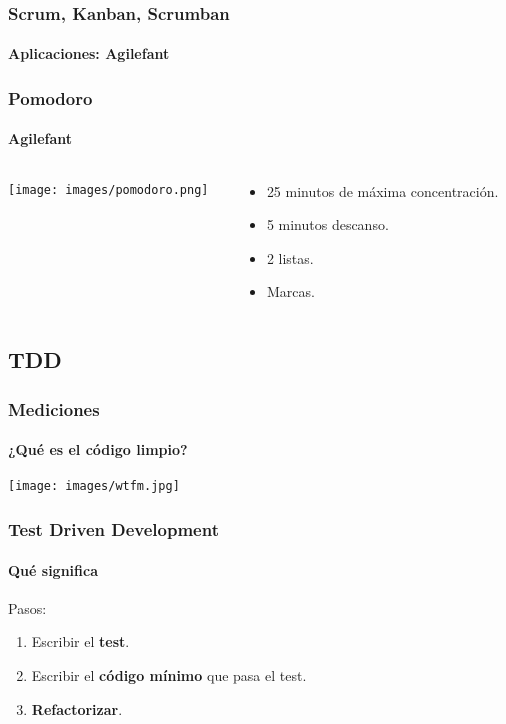   \begin{frame}
   \frametitle{Scrum, Kanban, Scrumban}
   \framesubtitle{Aplicaciones: Agilefant}

   \begin{center}
   \end{center}

  \end{frame}

  \begin{frame}
   \frametitle{Pomodoro}
   \framesubtitle{Agilefant}

   \begin{columns}
    \begin{column}{4cm}
     \texttt{[image: images/pomodoro.png]}
    \end{column}
    \begin{column}{7cm}
     \begin{itemize}
      \item 25 minutos de máxima concentración.
      \item 5 minutos descanso.
      \item 2 listas.
      \item Marcas.
     \end{itemize}
    \end{column}
   \end{columns}
  \end{frame}

  \subsection{TDD}

  \begin{frame}
   \frametitle{Mediciones}
   \framesubtitle{¿Qué es el código limpio?}

   \begin{center}
    \texttt{[image: images/wtfm.jpg]}
   \end{center}
  \end{frame}



  \begin{frame}
   \frametitle{Test Driven Development}
   \framesubtitle{Qué significa}

   Pasos:
   \begin{enumerate}
    \item Escribir el \textbf{test}.
    \item Escribir el \textbf{código mínimo} que pasa el test.
    \item \textbf{Refactorizar}.
   \end{enumerate}
  \end{frame}


